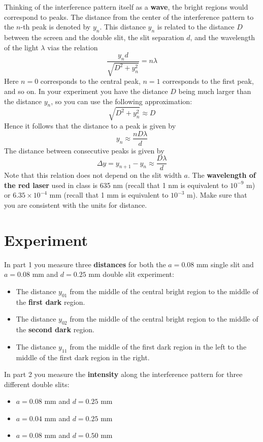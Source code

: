 Thinking of the interference pattern itself as a \textbf{wave}, the bright regions would correspond to peaks. The distance from the center of the interference pattern to the $n$-th peak is denoted by $y_{n}$. This distance $y_{n}$ is related to the distance $D$ between the screen and the double slit, the slit separation $d$, and the wavelength of the light $\lambda$ vias the relation
\begin{equation}
	\frac{y_{n} d}{\sqrt{D^{2} + y_{n}^{2}}} = n \lambda
\end{equation}
Here $n = 0$ corresponds to the central peak, $n = 1$ corresponds to the first peak, and so on. In your experiment you have the distance $D$ being much larger than the distance $y_{n}$, so you can use the following approximation:
\begin{equation}
	\sqrt{D^{2} + y_{n}^{2}} \approx D
\end{equation}
Hence it follows that the distance to a peak is given by
\begin{equation}
	y_{n} \approx \frac{n D \lambda}{d}
\end{equation}
The distance between consecutive peaks is given by
\begin{equation}
	\Delta y = y_{n+1} - y_{n} \approx \frac{D \lambda}{d}
	\label{eq.10.y}
\end{equation}
Note that this relation does not depend on the slit width $a$. The \textbf{wavelength of the red laser} used in class is 635 nm (recall that 1 nm is equivalent to $10^{-9}$ m) or $6.35 \times 10^{-4}$ mm (recall that 1 mm is equivalent to $10^{-3}$ m). Make sure that you are consistent with the units for distance.
\section{Experiment}
In part 1 you measure three \textbf{distances} for both the $a = 0.08$ mm single slit and $a = 0.08$ mm and $d = 0.25$ mm double slit experiment:
\begin{itemize}
	\item The distance $y_{01}$ from the middle of the central bright region to the middle of the \textbf{first dark} region.
	\item The distance $y_{02}$ from the middle of the central bright region to the middle of the \textbf{second dark} region.
	\item The distance $y_{11}$ from the middle of the first dark region in the left to the middle of the first dark region in the right.
\end{itemize}
In part 2 you measure the \textbf{intensity} along the interference pattern for three different double slits:
\begin{itemize}
	\item $a = 0.08$ mm and $d = 0.25$ mm
	\item $a = 0.04$ mm and $d = 0.25$ mm
	\item $a = 0.08$ mm and $d = 0.50$ mm
\end{itemize}
